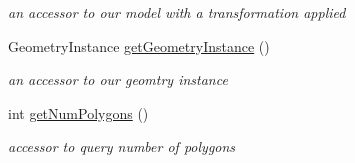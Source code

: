 \begin{DoxyCompactItemize}
\begin{DoxyCompactList}\small\item\em an accessor to our model with a transformation applied \end{DoxyCompactList}\item 
\hypertarget{class_opti_x_model_af4413a009cacd533af2922a34fe35d81}{Geometry\-Instance \hyperlink{class_opti_x_model_af4413a009cacd533af2922a34fe35d81}{get\-Geometry\-Instance} ()}\label{class_opti_x_model_af4413a009cacd533af2922a34fe35d81}

\begin{DoxyCompactList}\small\item\em an accessor to our geomtry instance \end{DoxyCompactList}\item 
\hypertarget{class_opti_x_model_aba60cfa935329bacb5c55b9e4dac0b7b}{int \hyperlink{class_opti_x_model_aba60cfa935329bacb5c55b9e4dac0b7b}{get\-Num\-Polygons} ()}\label{class_opti_x_model_aba60cfa935329bacb5c55b9e4dac0b7b}

\begin{DoxyCompactList}\small\item\em accessor to query number of polygons \end{DoxyCompactList}\end{DoxyCompactItemize}
